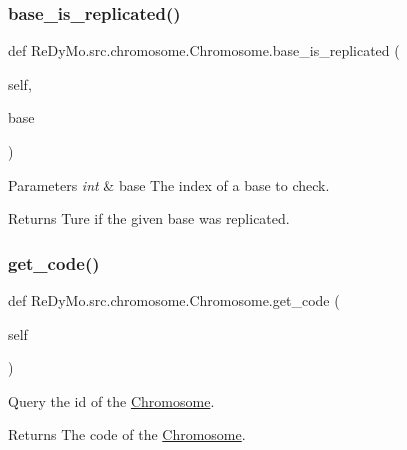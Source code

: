 \subsubsection{\texorpdfstring{base\+\_\+is\+\_\+replicated()}{base\_is\_replicated()}}
{\footnotesize\ttfamily def Re\+Dy\+Mo.\+src.\+chromosome.\+Chromosome.\+base\+\_\+is\+\_\+replicated (\begin{DoxyParamCaption}\item[{}]{self,  }\item[{}]{base }\end{DoxyParamCaption})}


\begin{DoxyParams}{Parameters}
{\em int} & base The index of a base to check. \\
\hline
\end{DoxyParams}
\begin{DoxyReturn}{Returns}
Ture if the given base was replicated. 
\end{DoxyReturn}
\mbox{\label{classReDyMo_1_1src_1_1chromosome_1_1Chromosome_a8fc8b953b0ba394a0dfc80fcdbcd274e}} 
\subsubsection{\texorpdfstring{get\+\_\+code()}{get\_code()}}
{\footnotesize\ttfamily def Re\+Dy\+Mo.\+src.\+chromosome.\+Chromosome.\+get\+\_\+code (\begin{DoxyParamCaption}\item[{}]{self }\end{DoxyParamCaption})}



Query the id of the \mbox{\hyperlink{classReDyMo_1_1src_1_1chromosome_1_1Chromosome}{Chromosome}}. 

\begin{DoxyReturn}{Returns}
The code of the \mbox{\hyperlink{classReDyMo_1_1src_1_1chromosome_1_1Chromosome}{Chromosome}}. 
\end{DoxyReturn}
\mbox{\label{classReDyMo_1_1src_1_1chromosome_1_1Chromosome_af22490836eb322b1dc55eaf10d14c7bb}} 

